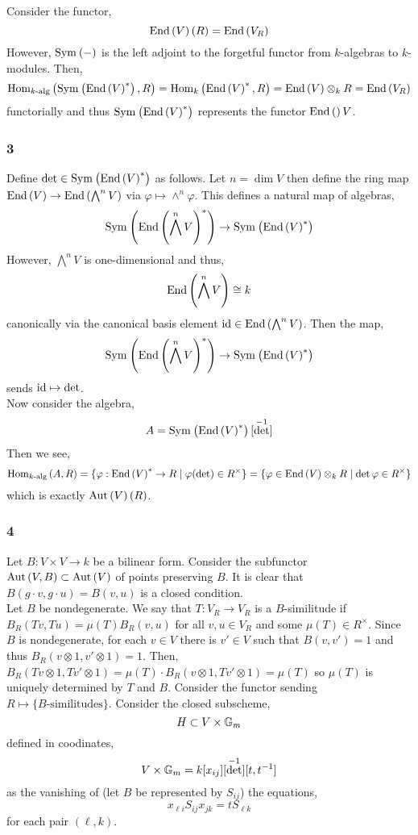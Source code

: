 \documentclass[12pt]{article}
\begin{document}
Consider the functor,
\[ \mathrm{End} \left( V \right)(R) = \mathrm{End} \left( V_R \right) \]
However, $\mathrm{Sym}_{}\left( - \right)$ is the left adjoint to the forgetful functor from $k$-algebras to $k$-modules. Then,
\[ \mathrm{Hom}_{k\text{-alg}} \left( \mathrm{Sym}_{}\left( \mathrm{End} \left( V \right)^* \right), R \right) = \mathrm{Hom}_{k} \left( \mathrm{End} \left( V \right)^*, R \right) = \mathrm{End} \left( V \right) \otimes_k R = \mathrm{End} \left( V_R \right) \]
functorially and thus $\mathrm{Sym}_{}\left( \mathrm{End} \left( V \right)^* \right)$ represents the functor $\mathrm{End} \left(  \right){V}$.

\subsubsection{3}

Define $\det \in \mathrm{Sym}_{}\left( \mathrm{End} \left( V \right)^* \right)$ as follows. Let $n = \dim{V}$ then define the ring map $\mathrm{End} \left( V \right) \to \mathrm{End} \left( \bigwedge^n V \right)$ via $\varphi \mapsto \wedge^n \varphi$. This defines a natural map of algebras,
\[ \mathrm{Sym}_{}\left( \mathrm{End} \left( \bigwedge^n V \right)^* \right) \to \mathrm{Sym}_{}\left( \mathrm{End} \left( V \right)^* \right) \]
However, $\bigwedge^n V$ is one-dimensional and thus,
\[ \mathrm{End} \left( \bigwedge^n V \right) \cong k \]
canonically via the canonical basis element $\mathrm{id} \in \mathrm{End} \left( \bigwedge^n V \right)$. Then the map,
\[ \mathrm{Sym}_{}\left( \mathrm{End} \left( \bigwedge^n V \right)^* \right) \to \mathrm{Sym}_{}\left( \mathrm{End} \left( V \right)^* \right) \]
sends $\mathrm{id} \mapsto \det$.
\bigskip\\
Now consider the algebra,
\[ A = \mathrm{Sym}_{}\left( \mathrm{End} \left( V \right)^* \right)[\det^{-1}] \]
Then we see,
\[ \mathrm{Hom}_{k\text{-alg}} \left( A, R \right) = \{ \varphi : \mathrm{End} \left( V \right)^* \to R \mid \varphi(\det) \in R^\times \} = \{ \varphi \in \mathrm{End} \left( V \right) \otimes_k R \mid \det{\varphi} \in R^\times \} \]
which is exactly $\mathrm{Aut} \left( V \right)(R)$.

\subsubsection{4}

Let $B : V \times V \to k$ be a bilinear form. Consider the subfunctor $\mathrm{Aut} \left( V,B \right) \subset \mathrm{Aut} \left( V \right)$ of points preserving $B$. It is clear that $B(g \cdot v, g \cdot u) = B(v,u)$ is a closed condition.
\bigskip\\
Let $B$ be nondegenerate. We say that $T : V_R \to V_R$ is a $B$-similitude if $B_R(T v, T u) = \mu(T) B_R(v,u)$ for all $v,u \in V_R$ and some $\mu(T) \in R^\times$. Since $B$ is nondegenerate, for each $v \in V$ there is $v' \in V$ such that $B(v,v') = 1$ and thus $B_R(v \otimes 1, v' \otimes 1) = 1$. Then, $B_R(T v \otimes 1, T v' \otimes 1) = \mu(T) \cdot B_R(v \otimes 1, T v' \otimes 1) = \mu(T)$ so $\mu(T)$ is uniquely determined by $T$ and $B$. Consider the functor sending $R \mapsto \{ B\text{-similitudes} \}$. Consider the closed subscheme,
\[ H \subset {}{V} \times \mathbb{G}_m \]
defined in coodinates,
\[ {}{V} \times \mathbb{G}_m = k[x_{ij}][\det^{-1}][t, t^{-1}] \]
as the vanishing of (let $B$ be represented by $S_{ij}$) the equations,
\[ x_{\ell i} S_{ij} x_{jk} = t S_{\ell k} \]
for each pair $(\ell, k)$.
\end{document}
